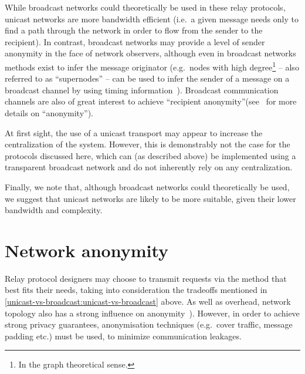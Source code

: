 While broadcast networks could theoretically be used in these relay protocols, unicast networks are more bandwidth efficient (i.e.~a given message needs only to find a path through the network in order to flow from the sender to the recipient). In contrast, broadcast networks may provide a level of sender anonymity in the face of network observers, although even in broadcast networks methods exist to infer the message originator (e.g.~nodes with high degree\footnote{In the graph theoretical sense.} -- also referred to as ``supernodes'' -- can be used to infer the sender of a message on a broadcast channel by using timing information~\cite{DBLP:conf/fc/KoshyKM14}). Broadcast communication channels are also of great interest to achieve ``recipient anonymity''(see~\cite{DBLP:journals/compsec/PfitzmannW87} for more details on ``anonymity'').

At first sight, the use of a unicast transport may appear to increase the centralization of the system. However, this is demonstrably not the case for the protocols discussed here, which can (as described above) be implemented using a transparent broadcast network and do not inherently rely on any centralization.

Finally, we note that, although broadcast networks could theoretically be used, we suggest that unicast networks are likely to be more suitable, given their lower bandwidth and complexity.

\section{Network anonymity}\label{unicast-vs-broadcast:network-anonymity}

Relay protocol designers may choose to transmit requests via the method that best fits their needs, taking into consideration the tradeoffs mentioned in \cref{unicast-vs-broadcast:unicast-vs-broadcast} above. As well as overhead, network topology also has a strong influence on anonymity~\cite{DBLP:conf/pet/DiazMT10}). However, in order to achieve strong privacy guarantees, anonymisation techniques (e.g.~cover traffic, message padding etc.) must be used, to minimize communication leakages.


